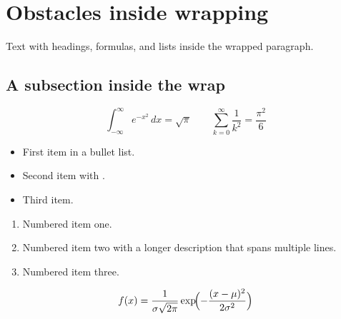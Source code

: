 \documentclass{article}
\begin{document}
\section*{Obstacles inside wrapping}

Text with headings, formulas, and lists inside the wrapped paragraph.

\lipsum[1]

\subsection*{A subsection inside the wrap}

\lipsum[2]

\[
  \int_{-\infty}^{\infty} e^{-x^2}\,dx = \sqrt{\pi}
\qquad
  \sum_{k=0}^{\infty} \frac{1}{k^2} = \frac{\pi^2}{6}
\]

\begin{itemize}
  \item First item in a bullet list.
  \item Second item with \lipsum[3][1].
  \item Third item.
\end{itemize}

\lipsum[4]

\begin{enumerate}
  \item Numbered item one.
  \item Numbered item two with a longer description
        that spans multiple lines.
  \item Numbered item three.
\end{enumerate}

\lipsum[5][1-3]

\[
  f(x) = \frac{1}{\sigma\sqrt{2\pi}} \exp\!\Bigl(-\frac{(x-\mu)^2}{2\sigma^2}\Bigr)
\]

\lipsum[6-8]
\end{document}
